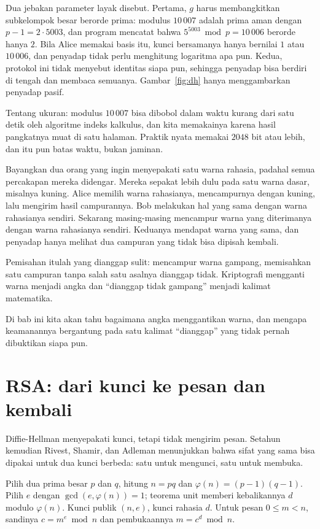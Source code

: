 Dua jebakan parameter layak disebut. Pertama, $g$ harus membangkitkan subkelompok besar berorde
prima: modulus $10\,007$ adalah prima aman dengan $p-1=2\cdot5003$, dan program mencatat bahwa
$5^{5003}\bmod p=10\,006$ berorde hanya $2$. Bila Alice memakai basis itu, kunci bersamanya
hanya bernilai $1$ atau $10\,006$, dan penyadap tidak perlu menghitung logaritma apa pun.
Kedua, protokol ini tidak menyebut identitas siapa pun, sehingga penyadap bisa berdiri di tengah
dan membaca semuanya. Gambar~\ref{fig:dh} hanya menggambarkan penyadap pasif.

Tentang ukuran: modulus $10\,007$ bisa dibobol dalam waktu kurang dari satu detik oleh
algoritme indeks kalkulus, dan kita memakainya karena hasil pangkatnya muat di satu halaman.
Praktik nyata memakai $2048$ bit atau lebih, dan itu pun batas waktu, bukan jaminan.

\begin{untukanak}
Bayangkan dua orang yang ingin menyepakati satu warna rahasia, padahal semua percakapan mereka
didengar. Mereka sepakat lebih dulu pada satu warna dasar, misalnya kuning. Alice memilih warna
rahasianya, mencampurnya dengan kuning, lalu mengirim hasil campurannya. Bob melakukan hal yang
sama dengan warna rahasianya sendiri. Sekarang masing-masing mencampur warna yang diterimanya
dengan warna rahasianya sendiri. Keduanya mendapat warna yang sama, dan penyadap hanya melihat
dua campuran yang tidak bisa dipisah kembali.

Pemisahan itulah yang dianggap sulit: mencampur warna gampang, memisahkan satu campuran tanpa
salah satu asalnya dianggap tidak. Kriptografi mengganti warna menjadi angka dan ``dianggap
tidak gampang'' menjadi kalimat matematika.

Di bab ini kita akan tahu bagaimana angka menggantikan warna, dan mengapa keamanannya
bergantung pada satu kalimat ``dianggap'' yang tidak pernah dibuktikan siapa pun.
\end{untukanak}

\section{RSA: dari kunci ke pesan dan kembali}

Diffie-Hellman menyepakati kunci, tetapi tidak mengirim pesan. Setahun kemudian Rivest,
Shamir, dan Adleman menunjukkan bahwa sifat yang sama bisa dipakai untuk dua kunci berbeda:
satu untuk mengunci, satu untuk membuka.

Pilih dua prima besar $p$ dan $q$, hitung $n=pq$ dan $\varphi(n)=(p-1)(q-1)$. Pilih $e$ dengan
$\gcd(e,\varphi(n))=1$; teorema unit memberi kebalikannya $d$ modulo $\varphi(n)$. Kunci publik
$(n,e)$, kunci rahasia $d$. Untuk pesan $0\le m<n$, sandinya $c=m^e\bmod n$ dan pembukaannya
$m=c^d\bmod n$.

